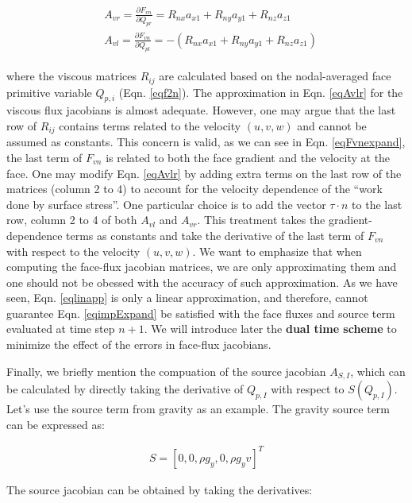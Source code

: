 \documentclass[12pt, letterpaper]{report}
\begin{document}
\begin{align}\label{eqAvlr}
   \begin{split}
      &A_{vr} = \frac{\partial F_{vn}}{\partial Q_{pr}} = R_{nx}a_{x1} + R_{ny}a_{y1} + R_{nz}a_{z1} \\
      &A_{vl} = \frac{\partial F_{vn}}{\partial Q_{pl}} = -(R_{nx}a_{x1} + R_{ny}a_{y1} + R_{nz}a_{z1})
   \end{split}
\end{align}

where the viscous matrices $R_{ij}$ are calculated based on the nodal-averaged face primitive
variable $Q_{p,i}$ (Eqn. \ref{eqf2n}). The approximation in Eqn. \ref{eqAvlr} for the viscous flux
jacobians is almost adequate. However, one may argue that the last row of $R_{ij}$ contains terms
related to the velocity $(u,v,w)$ and cannot be assumed as constants. This concern is valid, as we
can see in Eqn. \ref{eqFvnexpand}, the last term of $F_{vn}$ is related to both the face gradient
and the velocity at the face. One may modify Eqn. \ref{eqAvlr} by adding extra terms on the last row
of the matrices (column 2 to 4) to account for the velocity dependence of the ``work done by surface
stress''. One particular choice is to add the vector $\tau \cdot n$ to the last row, column 2 to 4
of both $A_{vl}$ and $A_{vr}$. This treatment takes the gradient-dependence terms as constants and
take the derivative of the last term of $F_{vn}$ with respect to the velocity $(u,v,w)$. We want to
emphasize that when computing the face-flux jacobian matrices, we are only approximating them and
one should not be obessed with the accuracy of such approximation. As we have seen, Eqn.
\ref{eqlinapp} is only a linear approximation, and therefore, cannot guarantee Eqn.
\ref{eqimpExpand} be satisfied with the face fluxes and source term evaluated at time step $n+1$. We
will introduce later the {\bf dual time scheme} to minimize the effect of the errors in face-flux
jacobians. \paraspace

Finally, we briefly mention the compuation of the source jacobian $A_{S,I}$, which can be calculated
by directly taking the derivative of $Q_{p,I}$ with respect to $S(Q_{p,I})$. Let's use the source
term from gravity as an example. The gravity source term can be expressed as:

\begin{align*}
   S = [0, 0, \rho g_y, 0, \rho g_y v]^T
\end{align*}

The source jacobian can be obtained by taking the derivatives:
\end{document}
